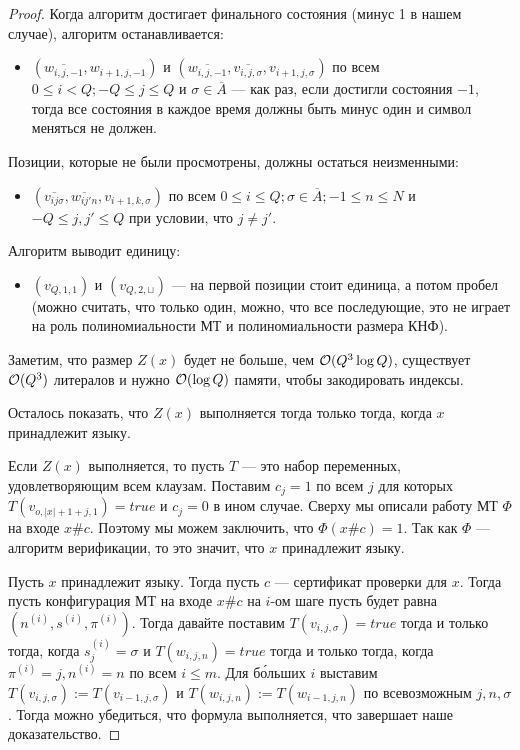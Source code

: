 \documentclass[a4paper, 12pt]{article}
\begin{document}
\begin{proof}
  Когда алгоритм достигает финального состояния (минус 1 в нашем случае), алгоритм
  останавливается:
  \begin{itemize}
    \item $(\overline{w_{i, j, -1}}, w_{i + 1, j, -1})$ и 
    $(\overline{w_{i, j, -1}}, \overline{v_{i, j, \sigma}}, v_{i + 1, j, \sigma})$
    по всем $0 \leqslant i < Q; -Q \leqslant j \leqslant Q$ и $\sigma \in
    \overline{A}$ --- как раз, если достигли состояния $-1$, тогда все состояния
    в каждое время должны быть минус один и символ меняться не должен.
  \end{itemize}

  Позиции, которые не были просмотрены, должны остаться неизменными:

  \begin{itemize}
    \item $(\overline{v_{ij\sigma}}, \overline{w_{ij'n}}, v_{i+1, k, \sigma})$
    по всем $0 \leqslant i \leqslant Q; \sigma \in \overline{A}; -1 \leqslant
    n \leqslant N$ и $-Q \leqslant j, j' \leqslant Q$ при условии, что $j \neq j'$.
  \end{itemize}

  Алгоритм выводит единицу:
  \begin{itemize}
    \item $(v_{Q, 1, 1})$ и $(v_{Q, 2, \sqcup})$ --- на первой позиции стоит
    единица, а потом пробел (можно считать, что только один, можно, что все
    последующие, это не играет на роль полиномиальности МТ и полиномиальности
    размера КНФ).
  \end{itemize}

  Заметим, что размер $Z(x)$ будет не больше, чем $\mathcal{O}(Q^3\log Q)$, существует
  $\mathcal{O}(Q^3)$ литералов и нужно $\mathcal{O}(\log Q)$ памяти, чтобы закодировать индексы.

  Осталось показать, что $Z(x)$ выполняется тогда только тогда, когда $x$
  принадлежит языку.

  Если $Z(x)$ выполняется, то пусть $T$ --- это набор переменных, удовлетворяющим
  всем клаузам. Поставим $c_j = 1$ по всем $j$ для которых 
  $T(v_{o, |x| + 1 + j, 1}) = true$ и $c_j = 0$ в ином случае. Сверху мы
  описали работу МТ $\Phi$ на входе $x\#c$. Поэтому мы можем заключить, что
  $\Phi(x\#c) = 1$. Так как $\Phi$ --- алгоритм верификации, то это значит, что
  $x$ принадлежит языку.

  Пусть $x$ принадлежит языку. Тогда пусть $c$ --- сертификат проверки для $x$.
  Тогда пусть конфигурация МТ на входе $x\#c$ на $i$-ом шаге пусть будет равна 
  $(n^{(i)}, s^{(i)}, \pi^{(i)})$. Тогда давайте поставим $T(v_{i,j,\sigma}) = 
  true$ тогда и только тогда, когда $s_j^{(i)} = \sigma$ и $T(w_{i, j, n})=true$
  тогда и только тогда, когда $\pi^{(i)} = j, n^{(i)} = n$ по всем $i \leqslant m$.
  Для б\'{о}льших $i$ выставим $T(v_{i, j, \sigma}) := T(v_{i - 1, j, \sigma})$
  и $T(w_{i, j, n}) := T(w_{i - 1, j, n})$ по всевозможным $j, n, \sigma$. Тогда
  можно убедиться, что формула выполняется, что завершает наше доказательство.
\end{proof}
\end{document}
